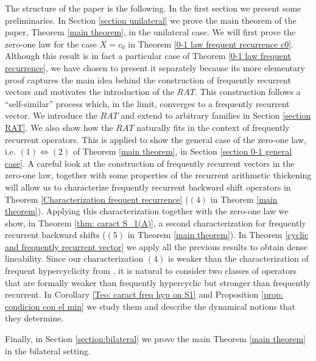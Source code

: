 \documentclass[11pt]{amsart}
\begin{document}
The structure of the paper is the following. In the first section we present some preliminaries.
In Section \ref{section unilateral} we prove the main theorem of the paper, Theorem \ref{main theorem}, in the unilateral case. We will first prove the zero-one law for the case $X=c_0$ in Theorem \ref{0-1 law frequent recurrence c0}.  Although this result is in fact a particular case of Theorem \ref{0-1 law frequent recurrence}, we have chosen to present it separately because its more elementary proof captures the main idea behind the construction of frequently recurrent vectors and motivates the introduction of the $RAT$. This construction  follows a ``self-similar'' process which, in the limit, converges to a frequently recurrent vector. 
We introduce the $RAT$ and  extend \cite[Theorem 2.17]{Fur81}   to arbitrary families in Section \ref{section RAT}. We also show how the $RAT$ naturally fits in the context of frequently recurrent operators.
This is applied to show the general case of the zero-one law, i.e. $(1)\Leftrightarrow (2)$ of Theorem \ref{main theorem}, in Section \ref{section 0-1 general case}.  A careful look at the construction of frequently recurrent vectors in the zero-one law, together with some properties of the recurrent arithmetic thickening will allow us to characterize frequently recurrent backward shift operators in Theorem \ref{Characterization frequent recurrence} ($ (4)$ in Theorem \ref{main theorem}). Applying this characterization together with the zero-one law 
we show, in Theorem \ref{thm: caract S_1(A)}, a second characterization for frequently recurrent backward shifts ($ (5)$ in Theorem \ref{main theorem}). In Theorem \ref{cyclic and frequently recurrent vector} we apply all the previous results to obtain dense lineability.
Since our characterization $(4)$ is weaker than the characterization of frequent hypercyclicity from \cite{BonGro18}, it is natural to consider two classes of operators that are formally weaker than frequently hypercyclic but stronger than frequently  recurrent.  In Corollary \ref{Teo: caract freq hyp on S1} and Proposition \ref{prop: condicion con el min} we study them and describe the dynamical notions that they determine.

Finally, in Section \ref{section:bilateral} we prove the  main Theorem \ref{main theorem} in the bilateral setting.
\end{document}
